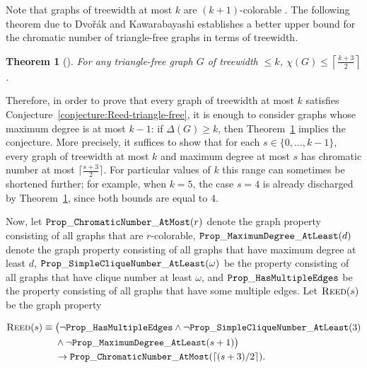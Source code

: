 \documentclass[11pt,a4paper]{article}
\newtheorem{theorem}{Theorem}
\newcommand{\treewidthvalue}{k}
\newcommand{\maxDegree}{\Delta}
\newcommand{\chromaticnumber}{\chi}
\newcommand{\agraph}{G}
\newcommand{\dpNamePart}[1]{\mbox{\normalfont\ttfamily #1}}
\newcommand{\hasMultiEdgeProperty}{\dpNamePart{Prop}\_\allowbreak\dpNamePart{HasMultipleEdges}}
\newcommand{\simpleCliqueNumberAtLeastProperty}[1]{\dpNamePart{Prop}\_\allowbreak\dpNamePart{SimpleCliqueNumber}\_\allowbreak\dpNamePart{AtLeast}(#1)}
\newcommand{\maxDegreeAtLeastProperty}[1]{\dpNamePart{Prop}\_\allowbreak\dpNamePart{MaximumDegree}\_\allowbreak\dpNamePart{AtLeast}(#1)}
\newcommand{\chromaticNumberAtMostProperty}[1]{\dpNamePart{Prop}\_\allowbreak\dpNamePart{ChromaticNumber}\_\allowbreak\dpNamePart{AtMost}(#1)}
\newcommand{\reedProperty}{\textsc{Reed}}
\newcommand{\numbercolors}{r}
\newcommand{\cliqueparameter}{\omega}
\newcommand{\maxdegreeparameter}{d}
\begin{document}
Note that graphs of treewidth at most $\treewidthvalue$ are $(\treewidthvalue+1)$-colorable \cite{bodlaender2005equitable}. The following theorem due to Dvo{\v{r}}\'{a}k and Kawarabayashi establishes a better upper bound for the chromatic number of triangle-free graphs in terms of treewidth.

\begin{theorem}[\cite{dvovrak2017triangle}]
\label{theorem:treewidthTrianglFreeChromaticNumber}
For any triangle-free graph $\agraph$ of treewidth $\leq \treewidthvalue$, $\chromaticnumber(\agraph) \leq \left\lceil \frac{\treewidthvalue + 3}{2}\right\rceil$.
\end{theorem}
%
Therefore, in order to prove that every graph of treewidth at most $\treewidthvalue$ satisfies
Conjecture~\ref{conjecture:Reed-triangle-free}, it is enough to consider graphs whose maximum degree is at most $\treewidthvalue-1$: if $\maxDegree(\agraph)\ge \treewidthvalue$, then Theorem~\ref{theorem:treewidthTrianglFreeChromaticNumber} implies the conjecture. More precisely, it suffices to show that for each $s\in \{0,\dots,\treewidthvalue-1\}$, every graph of treewidth at most $\treewidthvalue$ and maximum degree at most $s$ has chromatic number at most $\lceil\frac{s + 3}{2}\rceil$. For particular values of $\treewidthvalue$ this range can sometimes be shortened further; for example, when $\treewidthvalue=5$, the case $s=4$ is already discharged by Theorem~\ref{theorem:treewidthTrianglFreeChromaticNumber}, since both bounds are equal to $4$.

Now, let $\chromaticNumberAtMostProperty{\numbercolors}$ denote the graph property consisting of all graphs that are $\numbercolors$-colorable, $\maxDegreeAtLeastProperty{\maxdegreeparameter}$
denote the graph property consisting of all graphs that have maximum degree at least $\maxdegreeparameter$, $\simpleCliqueNumberAtLeastProperty{\cliqueparameter}$ be the property consisting of all graphs that have clique number at least $\cliqueparameter$, and $\hasMultiEdgeProperty$ be the property consisting of all graphs that have some multiple edges. Let
$\reedProperty(s)$ be the graph property

\begin{equation}
\label{equation:ReedProperty}
\begin{aligned}
\reedProperty(s) \equiv{}&
\bigl(\neg \hasMultiEdgeProperty
\wedge \neg \simpleCliqueNumberAtLeastProperty{3}\\
&{}\wedge \neg \maxDegreeAtLeastProperty{s+1}\bigr)\\
&{}\rightarrow \chromaticNumberAtMostProperty{\lceil (s+3)/2 \rceil}.
\end{aligned}
\end{equation}
\end{document}
